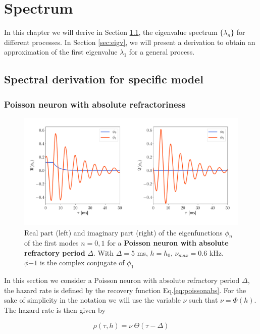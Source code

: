 \documentclass[12pt,twoside]{report}
\begin{document}
\chapter{Spectrum}
\label{chap:spectrum}

In this chapter we will derive  in Section \ref{sec:specif-model}, the eigenvalue spectrum $\{\lambda_n\}$ for different processes. In Section \ref{sec:eigv}, we will present a derivation to obtain an approximation of the first eigenvalue $\lambda_1$ for a general process.

\section{Spectral derivation for specific model}
\label{sec:specif-model}


\subsection{Poisson neuron with absolute refractoriness}
\label{subsec:absref}

\begin{figure}[h!]
	\centering
	\includegraphics[width=0.8\linewidth]{poisson_eigenfunction2.pdf}
	\caption{Real part (left) and imaginary part (right) of the eigenfunctions $\phi_n$ of the first modes $n=0,1$ for a \textbf{Poisson neuron with absolute refractory period} $\Delta$. With $\Delta=5$ ms, $h=h_0$, $\nu_{max}=0.6$ kHz. $\phi{-1}$ is the complex conjugate of $\phi_{1}$}
	\label{fig:poissoneigenfunction}
\end{figure} 

In this section we consider a Poisson neuron with absolute refractory period $\Delta$, the hazard rate is defined by the recovery function Eq.\eqref{eq:poissonabs}. For the sake of simplicity in the notation we will use the variable $\nu$ such that $\nu=\Phi(h)$. The hazard rate is then given by

\begin{equation}
\rho(\tau,h)=\nu\:\Theta(\tau-\Delta)
\end{equation}
\end{document}
